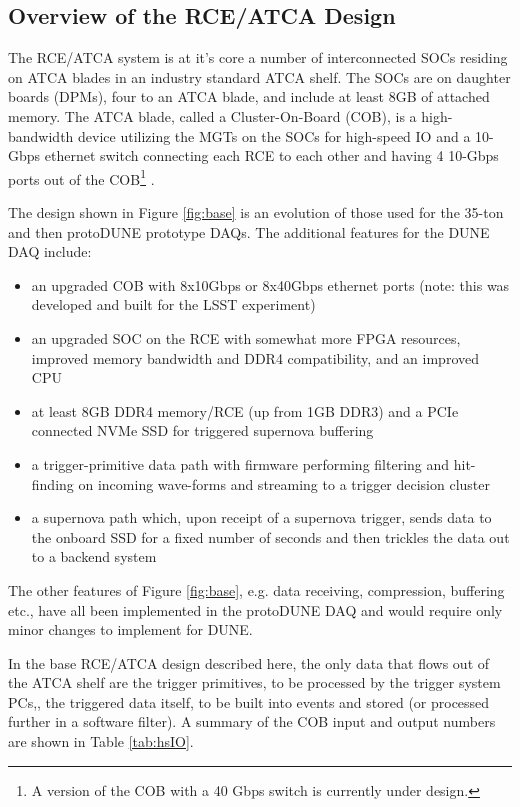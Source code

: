 \subsection{Overview of the RCE/ATCA Design }



The RCE/ATCA system is at it's core a number of interconnected SOCs residing on  ATCA blades in an industry standard ATCA shelf.   The SOCs are on daughter boards (DPMs),  four to an ATCA blade, and include at least 8GB of attached memory.  The ATCA blade, called a Cluster-On-Board (COB), is a high-bandwidth device utilizing the MGTs on the SOCs for high-speed IO and a 10-Gbps ethernet switch connecting each RCE to each other and having 4 10-Gbps ports out of the COB\footnote{A version of the COB with a 40 Gbps switch is currently under design.} .  


The design shown in Figure \ref{fig:base} is an evolution of those used for the 35-ton and then protoDUNE prototype DAQs.  The additional features for the DUNE DAQ include:
\begin{itemize}
    \item an upgraded COB with 8x10Gbps or 8x40Gbps ethernet ports (note:  this was developed and built for the LSST experiment) 
    \item an upgraded SOC on the RCE with somewhat more FPGA resources, improved memory bandwidth and DDR4 compatibility, and an improved CPU
    \item at least 8GB DDR4  memory/RCE (up from 1GB DDR3) and a PCIe connected NVMe SSD for triggered supernova buffering
    \item a trigger-primitive data path with firmware performing filtering and hit-finding on incoming wave-forms and streaming to a trigger decision cluster
    \item a supernova path which, upon receipt of a supernova trigger, sends data to the onboard SSD for a fixed number of seconds and then trickles the data out to a backend system
\end{itemize}
The other features of Figure \ref{fig:base}, e.g. data receiving, compression, buffering etc., have all been implemented in the protoDUNE DAQ and would require only minor changes to implement for DUNE.  

In the base RCE/ATCA design described here, the only data that flows out of the ATCA shelf are the trigger primitives, to be processed by the trigger system PCs,, the triggered data itself, to be built into events and stored (or processed further in a software filter).  A summary of the COB input and output numbers are shown in Table \ref{tab:hsIO}.  

